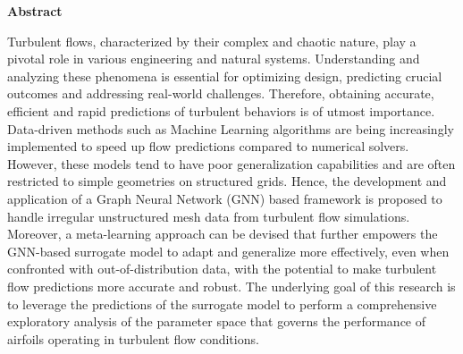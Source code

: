 \clearemptydoublepage
{}
{}

\vspace*{2cm}
\begin{center}
{\Large \textbf{Abstract}}
\end{center}
\vspace{1cm}
Turbulent flows, characterized by their complex and chaotic nature, play a pivotal role in various engineering and natural systems. Understanding and analyzing these phenomena is essential for optimizing design, predicting crucial outcomes and addressing real-world challenges. Therefore, obtaining accurate, efficient and rapid predictions of turbulent behaviors is of utmost importance. Data-driven methods such as Machine Learning algorithms are being increasingly implemented to speed up flow predictions compared to numerical solvers. However, these models tend to have poor generalization capabilities and are often restricted to simple geometries on structured grids. Hence, the development and application of a Graph Neural Network (GNN) based framework is proposed to handle irregular unstructured mesh data from turbulent flow simulations. Moreover, a meta-learning approach can be devised that further empowers the GNN-based surrogate model to adapt and generalize more effectively, even when confronted with out-of-distribution data, with the potential to make turbulent flow predictions more accurate and robust. The underlying goal of this research is to leverage the predictions of the surrogate model to perform a comprehensive exploratory analysis of the parameter space that governs the performance of airfoils operating in turbulent flow conditions.
